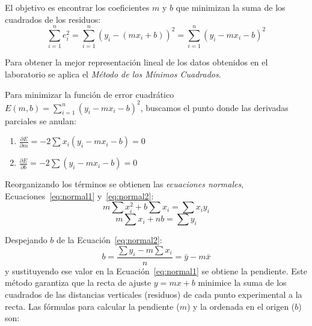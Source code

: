 El objetivo es encontrar los coeficientes $m$ y $b$ que minimizan la suma de los cuadrados de los residuos:
\begin{equation}\label{eq:error_cuadratico} 
    \sum_{i=1}^n e_i^2 = \sum_{i=1}^n {(y_i - (mx_i + b))}^2 = \sum_{i=1}^n {(y_i - mx_i - b)}^2
\end{equation}

Para obtener la mejor representación lineal de los datos obtenidos en el laboratorio se aplica el \emph{Método de los Mínimos Cuadrados}.

Para minimizar la función de error cuadrático $E(m, b) = \sum_{i=1}^n {(y_i - mx_i - b)}^2$, buscamos el punto donde las derivadas parciales se anulan:

\begin{enumerate}
    \item $\frac{\partial E}{\partial m} = -2\sum x_i (y_i - mx_i - b) = 0$
    \item $\frac{\partial E}{\partial b} = -2\sum (y_i - mx_i - b) = 0$
\end{enumerate}

Reorganizando los términos se obtienen las \emph{ecuaciones normales}, Ecuaciones~\eqref{eq:normal1} y~\eqref{eq:normal2}:
\begin{equation} \label{eq:normal1}
    m\sum x_i^2 + b\sum x_i = \sum x_i y_i
\end{equation}
\begin{equation} \label{eq:normal2}
    m\sum x_i + nb = \sum y_i
\end{equation}

Despejando $b$ de la Ecuación~\eqref{eq:normal2}:
\[ b = \frac{\sum y_i - m\sum x_i}{n} = \bar{y} - m\bar{x} \]
y sustituyendo ese valor en la Ecuación~\eqref{eq:normal1} se obtiene la pendiente. Este método garantiza que la recta de ajuste $y = mx + b$ minimice la suma de los cuadrados de las distancias verticales (residuos) de cada punto experimental a la recta. Las fórmulas para calcular la pendiente ($m$) y la ordenada en el origen ($b$) son:

